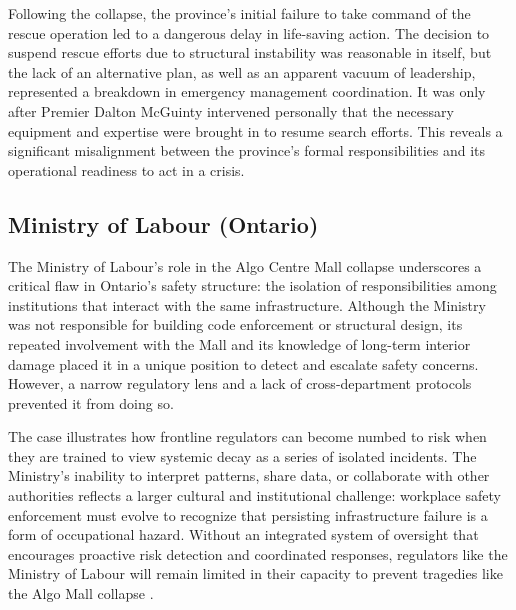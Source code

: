 \documentclass[12pt]{article}
\begin{document}
Following the collapse, the province's initial failure to take command of the rescue operation led to a dangerous delay in life-saving action. The decision to suspend rescue efforts due to structural instability was reasonable in itself, but the lack of an alternative plan, as well as an apparent vacuum of leadership, represented a breakdown in emergency management coordination. It was only after Premier Dalton McGuinty intervened personally that the necessary equipment and expertise were brought in to resume search efforts. This reveals a significant misalignment between the province's formal responsibilities and its operational readiness to act in a crisis.

\subsection{Ministry of Labour (Ontario)}

The Ministry of Labour's role in the Algo Centre Mall collapse underscores a critical flaw in Ontario's safety structure: the isolation of responsibilities among institutions that interact with the same infrastructure. Although the Ministry was not responsible for building code enforcement or structural design, its repeated involvement with the Mall and its knowledge of long-term interior damage placed it in a unique position to detect and escalate safety concerns. However, a narrow regulatory lens and a lack of cross-department protocols prevented it from doing so.

The case illustrates how frontline regulators can become numbed to risk when they are trained to view systemic decay as a series of isolated incidents. The Ministry's inability to interpret patterns, share data, or collaborate with other authorities reflects a larger cultural and institutional challenge: workplace safety enforcement must evolve to recognize that persisting infrastructure failure is a form of occupational hazard. Without an integrated system of oversight that encourages proactive risk detection and coordinated responses, regulators like the Ministry of Labour will remain limited in their capacity to prevent tragedies like the Algo Mall collapse \cite[p140-149]{AlgoLakeReport1}.
\end{document}

